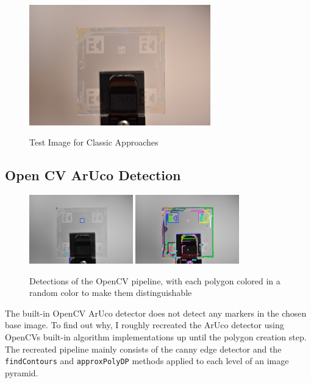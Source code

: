 \documentclass[10pt]{book}
\begin{document}
\begin{figure}
  \caption{Test Image for Classic Approaches}
  \includegraphics[width=0.7\textwidth]{image/classic_base_img}
  \label{fig:classic_base_img}
\end{figure}

\subsection{Open CV ArUco Detection}

\begin{figure}
  \centering
     {\includegraphics[width=0.4\textwidth]{image/classic_base_img_opencv_det_small}}
     {\includegraphics[width=0.4\textwidth]{image/classic_base_img_opencv_det_all}}
  \caption{Detections of the \ac{OpenCV} pipeline, with each polygon colored in a random color to make them distinguishable}
  \label{fig:classic_base_img_opencv}
\end{figure}

The built-in \ac{OpenCV} \ac{ArUco} detector does not detect any markers in the chosen base image. To find out why, I roughly recreated the \ac{ArUco} detector using \acp{OpenCV} built-in algorithm implementations up until the polygon creation step. The recreated pipeline mainly consists of the canny edge detector and the \texttt{findContours} and \texttt{approxPolyDP} methods applied to each level of an image pyramid. 
\end{document}
